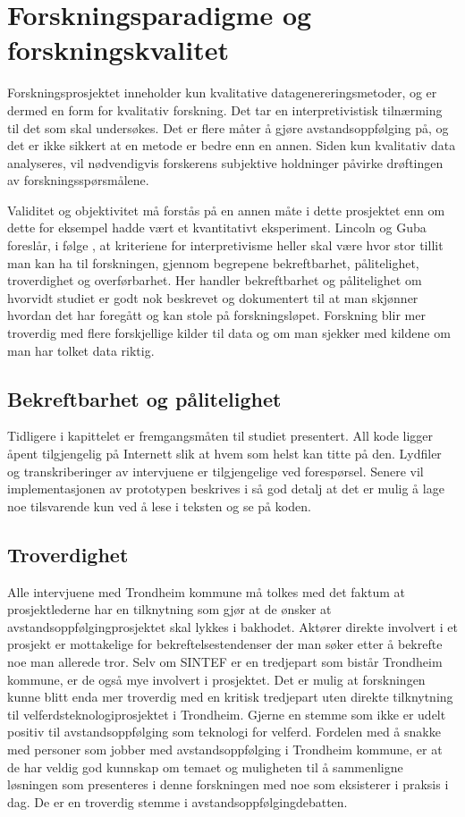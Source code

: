 \section{Forskningsparadigme og forskningskvalitet}
Forskningsprosjektet inneholder kun kvalitative datagenereringsmetoder, og er dermed en form for kvalitativ forskning.
Det tar en interpretivistisk tilnærming til det som skal undersøkes. Det er flere måter å gjøre avstandsoppfølging på,
og det er ikke sikkert at en metode er bedre enn en annen.
Siden kun kvalitativ data analyseres, vil nødvendigvis forskerens subjektive holdninger påvirke drøftingen av forskningsspørsmålene.

Validitet og objektivitet må forstås på en annen måte i dette prosjektet enn om dette for eksempel hadde vært et
kvantitativt eksperiment. Lincoln og Guba foreslår, i følge \citet{oates},
at kriteriene for interpretivisme
heller skal være hvor stor tillit man kan ha til forskningen, gjennom begrepene bekreftbarhet, pålitelighet, troverdighet og overførbarhet.
Her handler bekreftbarhet og pålitelighet om hvorvidt studiet er godt nok beskrevet og dokumentert til at man skjønner hvordan det har
foregått og kan stole
på forskningsløpet. Forskning blir mer troverdig med flere forskjellige kilder til data og om man sjekker med kildene om man har
tolket data riktig.

\subsection{Bekreftbarhet og pålitelighet}
Tidligere i kapittelet er fremgangsmåten til studiet presentert. All kode ligger åpent tilgjengelig på Internett slik at hvem som helst kan
titte på den. Lydfiler og transkriberinger av intervjuene er tilgjengelige ved forespørsel. Senere vil implementasjonen av prototypen beskrives i
så god detalj at det er mulig å lage noe tilsvarende kun ved å lese i teksten og se på koden.

\subsection{Troverdighet}
Alle intervjuene med Trondheim kommune må tolkes med det faktum at prosjektlederne har en tilknytning som
gjør at de ønsker at avstandsoppfølgingprosjektet
skal lykkes i bakhodet. Aktører direkte involvert i et prosjekt er mottakelige for bekreftelsestendenser der man søker etter å bekrefte noe
man allerede tror. Selv om SINTEF er en tredjepart som bistår Trondheim kommune, er de også mye involvert i prosjektet.
Det er mulig at forskningen kunne blitt enda mer troverdig med en kritisk tredjepart uten direkte tilknytning til velferdsteknologiprosjektet i Trondheim.
Gjerne en stemme som ikke er udelt positiv til avstandsoppfølging som teknologi for velferd.
Fordelen med å snakke med personer som jobber med avstandsoppfølging i Trondheim kommune, er at de har veldig god kunnskap om temaet
og muligheten til å sammenligne løsningen som presenteres i denne forskningen med noe som eksisterer i praksis i dag.
De er en troverdig stemme i avstandsoppfølgingdebatten.

